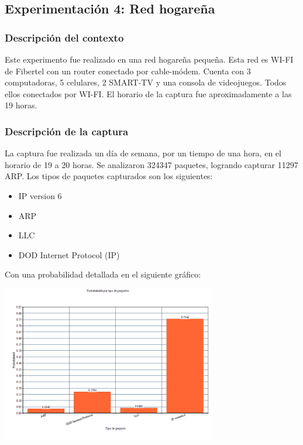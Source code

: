 \subsection{Experimentaci\'on 4: Red hogare\~na}

\subsubsection{Descripci\'on del contexto}

Este experimento fue realizado en una red hogareña pequeña. Esta red es WI-FI de Fibertel con un router conectado por cable-módem. Cuenta con 3 computadoras, 5 celulares, 2 SMART-TV y una consola de videojuegos. Todos ellos conectados por WI-FI. El horario de la captura fue aproximadamente a las 19 horas. 

\subsubsection{Descripci\'on de la captura}

La captura fue realizada un d\'ia de semana, por un tiempo de una hora, en el horario de 19 a 20 horas. Se analizaron 324347 paquetes, logrando capturar 11297 ARP. Los tipos de paquetes capturados son los siguientes:

\begin{itemize}
\item IP version 6
\item ARP
\item LLC
\item DOD Internet Protocol (IP)
\end{itemize}

Con una probabilidad detallada en el siguiente gr\'afico: 

\begin{center}
\includegraphics[width=0.7\textwidth]{exp4-graficos/exp4_1.png}
\end{center}

